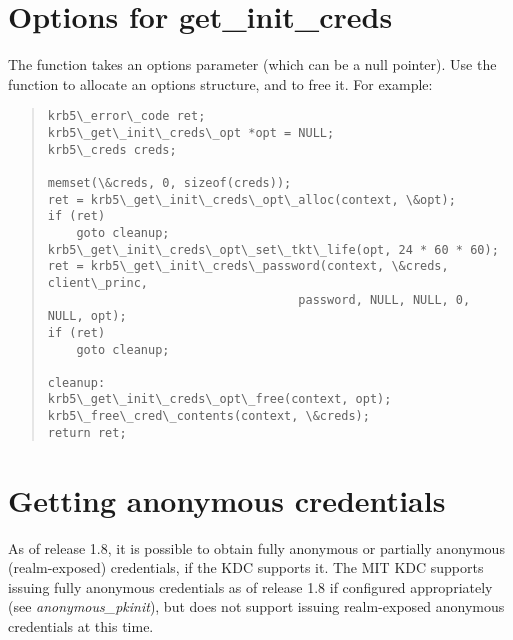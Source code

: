 \documentclass[letterpaper,10pt,english]{sphinxmanual}
\begin{document}
\section{Options for get\_init\_creds}
\label{appdev/init_creds:options-for-get-init-creds}
The function {\hyperref[appdev/refs/api/krb5_get_init_creds_password:krb5_get_init_creds_password]{}} takes an options
parameter (which can be a null pointer).  Use the function
{\hyperref[appdev/refs/api/krb5_get_init_creds_opt_alloc:krb5_get_init_creds_opt_alloc]{}} to allocate an options
structure, and {\hyperref[appdev/refs/api/krb5_get_init_creds_opt_free:krb5_get_init_creds_opt_free]{}} to free it.  For
example:
\begin{quote}

\begin{Verbatim}[commandchars=\\\{\}]
krb5\_error\_code ret;
krb5\_get\_init\_creds\_opt *opt = NULL;
krb5\_creds creds;

memset(\&creds, 0, sizeof(creds));
ret = krb5\_get\_init\_creds\_opt\_alloc(context, \&opt);
if (ret)
    goto cleanup;
krb5\_get\_init\_creds\_opt\_set\_tkt\_life(opt, 24 * 60 * 60);
ret = krb5\_get\_init\_creds\_password(context, \&creds, client\_princ,
                                   password, NULL, NULL, 0, NULL, opt);
if (ret)
    goto cleanup;

cleanup:
krb5\_get\_init\_creds\_opt\_free(context, opt);
krb5\_free\_cred\_contents(context, \&creds);
return ret;
\end{Verbatim}
\end{quote}


\section{Getting anonymous credentials}
\label{appdev/init_creds:getting-anonymous-credentials}
As of release 1.8, it is possible to obtain fully anonymous or
partially anonymous (realm-exposed) credentials, if the KDC supports
it.  The MIT KDC supports issuing fully anonymous credentials as of
release 1.8 if configured appropriately (see \emph{anonymous\_pkinit}),
but does not support issuing realm-exposed anonymous credentials at
this time.
\end{document}
